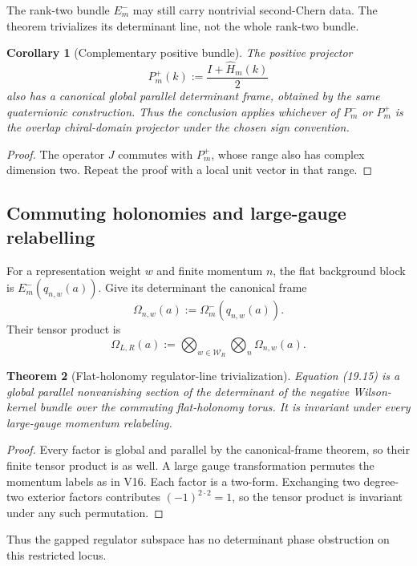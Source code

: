 \documentclass[11pt]{article}
\newtheorem{theorem}{Theorem}[section]
\newtheorem{corollary}[theorem]{Corollary}
\begin{document}
The rank-two bundle \(E_m^-\) may still carry nontrivial second-Chern
data.  The theorem trivializes its determinant line, not the whole
rank-two bundle.

\begin{corollary}[Complementary positive bundle]
\label{cor:v11v19-positive-bundle}
The positive projector
\[
 P_m^+(k):=\frac{I+\widehat H_m(k)}2
\]
also has a canonical global parallel determinant frame, obtained by the
same quaternionic construction.  Thus the conclusion applies whichever
of \(P_m^-\) or \(P_m^+\) is the overlap chiral-domain projector under
the chosen sign convention.
\end{corollary}

\begin{proof}
The operator \(J\) commutes with \(P_m^+\), whose range also has complex
dimension two.  Repeat the proof with a local unit vector in that range.
\end{proof}

\subsection{Commuting holonomies and large-gauge relabelling}

For a representation weight \(w\) and finite momentum \(n\), the flat
background block is \(E_m^-(q_{n,w}(a))\).  Give its determinant the
canonical frame
\[
 \Omega_{n,w}(a):=
 \Omega_m^-(q_{n,w}(a)).
 \tag{19.14}
\]
Their tensor product is
\[
 \Omega_{L,R}(a):=
 \bigotimes_{w\in\mathcal W_R}\bigotimes_n\Omega_{n,w}(a).
 \tag{19.15}
\]

\begin{theorem}[Flat-holonomy regulator-line trivialization]
\label{thm:v11v19-flat-line}
Equation (19.15) is a global parallel nonvanishing section of the
determinant of the negative Wilson-kernel bundle over the commuting
flat-holonomy torus.  It is invariant under every large-gauge momentum
relabeling.
\end{theorem}

\begin{proof}
Every factor is global and parallel by the canonical-frame theorem, so
their finite tensor product is as well.  A large gauge transformation
permutes the momentum labels as in V16.  Each factor is a two-form.
Exchanging two degree-two exterior factors contributes
\((-1)^{2\cdot2}=1\), so the tensor product is invariant under any such
permutation.
\end{proof}

Thus the gapped regulator subspace has no determinant phase obstruction on
this restricted locus.
\end{document}

